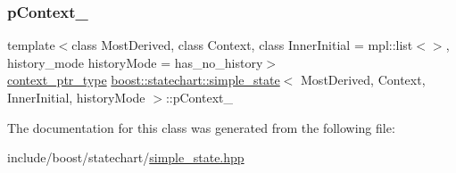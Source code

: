 \subsubsection{\texorpdfstring{p\+Context\+\_\+}{pContext\_}}
{\footnotesize\ttfamily template$<$class Most\+Derived, class Context, class Inner\+Initial = mpl\+::list$<$$>$, history\+\_\+mode history\+Mode = has\+\_\+no\+\_\+history$>$ \\
\mbox{\hyperlink{classboost_1_1statechart_1_1simple__state_ac7e361322d53b3f57976ff23056b59e7}{context\+\_\+ptr\+\_\+type}} \mbox{\hyperlink{classboost_1_1statechart_1_1simple__state}{boost\+::statechart\+::simple\+\_\+state}}$<$ Most\+Derived, Context, Inner\+Initial, history\+Mode $>$\+::p\+Context\+\_\+\hspace{0.3cm}{\ttfamily [private]}}



The documentation for this class was generated from the following file\+:\begin{DoxyCompactItemize}
\item 
include/boost/statechart/\mbox{\hyperlink{simple__state_8hpp}{simple\+\_\+state.\+hpp}}\end{DoxyCompactItemize}

